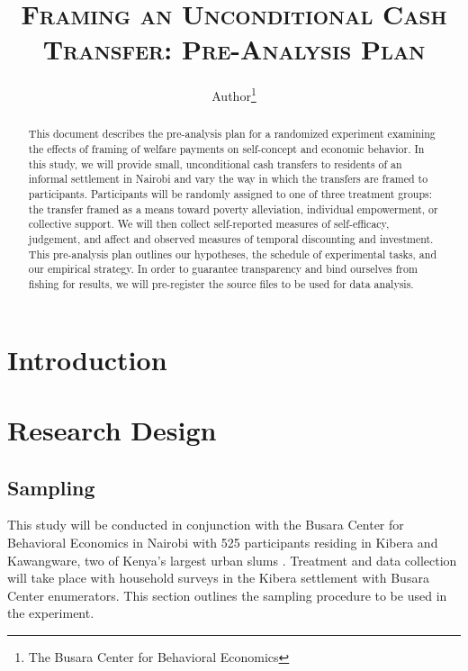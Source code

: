 \documentclass[11pt, a4paper]{article}\usepackage[]{graphicx}\usepackage[]{color}
\begin{document}
\title{\textsc{Framing an Unconditional Cash Transfer: Pre-Analysis Plan}}
\author{Author\footnote{The Busara Center for Behavioral Economics}}

\maketitle

\begin{abstract}

    This document describes the pre-analysis plan for a randomized experiment examining the effects of framing of welfare payments on self-concept and economic behavior. In this study, we will provide small, unconditional cash transfers to residents of an informal settlement in Nairobi and vary the way in which the transfers are framed to participants. Participants will be randomly assigned to one of three treatment groups: the transfer framed as a means toward poverty alleviation, individual empowerment, or collective support. We will then collect self-reported measures of self-efficacy, judgement, and affect and observed measures of temporal discounting and investment. This pre-analysis plan outlines our hypotheses, the schedule of experimental tasks, and our empirical strategy. In order to guarantee transparency and bind ourselves from fishing for results, we will pre-register the source files to be used for data analysis.

\end{abstract}

\newpage

\tableofcontents

\newpage

\section{Introduction}

\section{Research Design}

    \subsection{Sampling}

        This study will be conducted in conjunction with the Busara Center for Behavioral Economics in Nairobi with 525 participants residing in Kibera and Kawangware, two of Kenya's largest urban slums \parencite{haushofer_methodology_2014}. Treatment and data collection will take place with household surveys in the Kibera settlement with Busara Center enumerators. This section outlines the sampling procedure to be used in the experiment.
\end{document}
